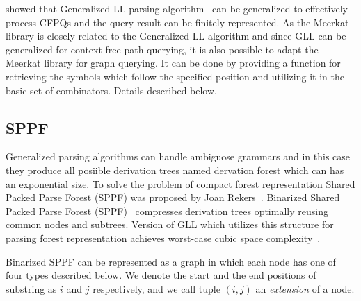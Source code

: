 \cite{GrigorevR16} showed that Generalized LL parsing algorithm~\cite{scott2010gll} can be generalized to effectively process CFPQs and the query result can be finitely represented.
As the Meerkat library is closely related to the Generalized LL algorithm and since GLL can be generalized for context-free path querying, it is also possible to adapt the Meerkat library for graph querying. 
It can be done by providing a function for retrieving the symbols which follow the specified position and utilizing it in the basic set of combinators.
Details described below.





\subsection{SPPF}

Generalized parsing algorithms can handle ambiguose grammars and in this case they produce all posiible derivation trees named dervation forest which can has an exponential size.
To solve the problem of compact forest representation Shared Packed Parse Forest (SPPF) was proposed by Joan Rekers~\cite{SPPF}.
Binarized Shared Packed Parse Forest (SPPF)~\cite{brnglr} compresses derivation trees optimally reusing common nodes and subtrees.
Version of GLL which utilizes this structure for parsing forest representation achieves worst-case cubic space complexity~\cite{gllParsingTree}.

Binarized SPPF can be represented as a graph in which each node has one of four types described below.
We denote the start and the end positions of substring as $i$ and $j$ respectively, and we call tuple $(i,j)$ an \textit{extension} of a node.

